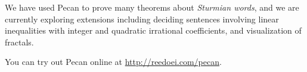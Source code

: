 \documentclass[landscape,usenames,dvipsnames, 25pt]{sciposter}
\begin{document}
\begin{multicols}{3}
\begin{itemize}
\end{itemize}

We have used Pecan to prove many theorems about \emph{Sturmian words}, and we are currently exploring extensions including deciding sentences involving linear inequalities with integer and quadratic irrational coefficients, and
visualization of fractals.

You can try out Pecan online at \url{http://reedoei.com/pecan}.










\end{multicols}
\end{document}
